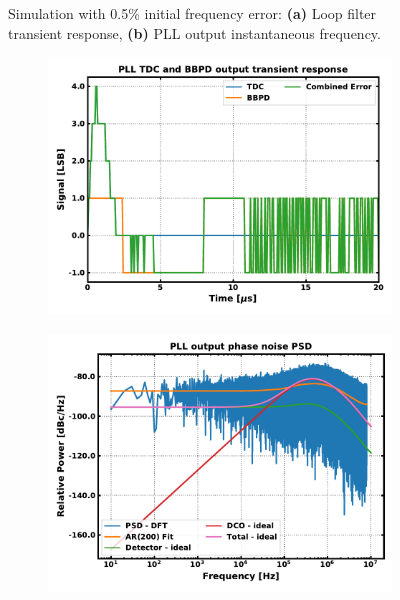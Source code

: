 \begin{figure}[htb!]
\begin{subfigure}{0.5\textwidth}
			        \caption{ }
			        \label{fig:trans_inst_freq_fast}
			    \end{subfigure}
			    \label{fig:trans_sim1_fast}
			    \caption{Simulation with 0.5\% initial frequency error: \textbf{(a)} Loop filter transient response, \textbf{(b)} PLL output instantaneous frequency.}
			\end{figure}

			\begin{figure}[htb!]
			    \centering
			    \begin{subfigure}{0.5\textwidth}
			        \centering
			        \center\includegraphics[width=1.0\textwidth, angle=0]{figs/trans_tdc_bbpd_fast.pdf}
			        \caption{ }
			        \label{fig:trans_det_fast}
			    \end{subfigure}%
			    \begin{subfigure}{0.5\textwidth}
			        \centering
			        \center\includegraphics[width=1.0\textwidth, angle=0]{figs/trans_phase_noise_fast.pdf}

\end{subfigure}
\end{figure}
